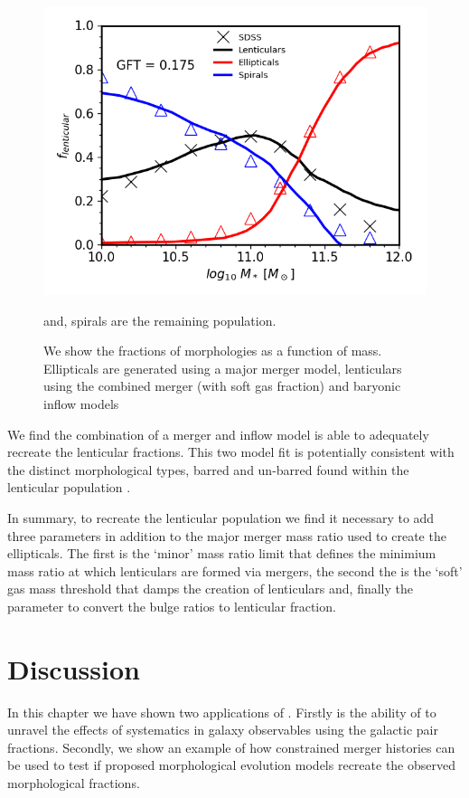 \begin{figure}
  \includegraphics[width=\linewidth]{Figures/Chapter5/Bulge_Growth_Final_All_Morph.png}
    \caption{We show the fractions of morphologies as a function of mass. Ellipticals are generated using a major merger model, lenticulars using the combined merger (with soft gas fraction) and baryonic inflow models} and, spirals are the remaining population.
    \label{fig:All_Morphologies}
\end{figure}

We find the combination of a merger and inflow model is able to adequately recreate the lenticular fractions. This two model fit is potentially consistent with the distinct morphological types, barred and un-barred found within the lenticular population \cite{Laurikainen2005MulticomponentGalaxies, VanDenBergh2012LuminositiesGalaxies}.

In summary, to recreate the lenticular population we find it necessary to add three parameters in addition to the major merger mass ratio used to create the ellipticals. The first is the `minor' mass ratio limit that defines the minimium mass ratio at which lenticulars are formed via mergers, the second the is the `soft' gas mass threshold that damps the creation of lenticulars and, finally the parameter to convert the bulge ratios to lenticular fraction. 

\section{Discussion}

In this chapter we have shown two applications of \steel. Firstly is the ability of \steel to unravel the effects of systematics in galaxy observables using the galactic pair fractions. Secondly, we show an example of how constrained merger histories can be used to test if proposed morphological evolution models recreate the observed morphological fractions.  

